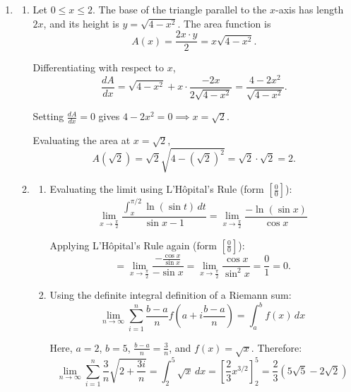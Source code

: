 \documentclass[a4paper, 12pt]{article}
\renewcommand{\headrulewidth}{0pt}
\renewcommand{\headrulewidth}{0pt}
\begin{document}
\newpage
{}
{}

\newpage
\pagestyle{fancy}
\renewcommand{\headrulewidth}{1pt}


\begin{enumerate}[leftmargin=*,label=\textbf{\arabic*.}]

\item \begin{enumerate}[leftmargin=*,label=\textbf{\alph*.}]
\item Let $0 \le x \le 2$. The base of the triangle parallel to the $x$-axis has length $2x$, and its height is $y = \sqrt{4-x^2}$. The area function is
\[A(x)=\frac{2x\cdot y}{2}=x\sqrt{4-x^2}.\]

Differentiating with respect to $x$,
\[\frac{dA}{dx}=\sqrt{4-x^2}+x\cdot\frac{-2x}{2\sqrt{4-x^2}}=\frac{4-2x^2}{\sqrt{4-x^2}}.\]

Setting $\frac{dA}{dx}=0$ gives $4-2x^2=0\implies x=\sqrt{2}$.

Evaluating the area at $x = \sqrt{2}$,
\[A\left(\sqrt{2}\right)=\sqrt{2}\sqrt{4-\left(\sqrt2\right)^2}=\sqrt2\cdot\sqrt{2}=\boxed2.\]

\item \begin{enumerate}[leftmargin=*,label=\textbf{\roman*.}]
\item Evaluating the limit using L'Hôpital's Rule (form $\left[\frac{0}{0}\right]$):
\[\lim_{x \to \frac{\pi}{2}} \frac{\int_{x}^{\pi/2} \ln(\sin t) \, dt}{\sin x - 1} = \lim_{x \to \frac{\pi}{2}} \frac{-\ln(\sin x)}{\cos x}\]

Applying L'Hôpital's Rule again (form $\left[\frac{0}{0}\right]$):
\[=\lim_{x\to\frac{\pi}{2}}\frac{-\frac{\cos x}{\sin x}}{-\sin x}=\lim_{x\to\frac{\pi}{2}} \frac{\cos x}{\sin^2 x}=\frac{0}{1}=\boxed0.\]

\item Using the definite integral definition of a Riemann sum:
\[\lim_{n \to \infty} \sum_{i=1}^{n} \frac{b-a}{n} f\left(a + i \frac{b-a}{n}\right) = \int_{a}^{b} f(x) \, dx\]

Here, $a=2$, $b=5$, $\frac{b-a}{n}=\frac{3}{n}$, and $f(x)=\sqrt{x}$. Therefore:
\[\lim_{n \to \infty}\sum_{i=1}^{n}\frac{3}{n}\sqrt{2+\frac{3i}{n}}=\int_{2}^{5}\sqrt{x}\,dx=\left[\frac{2}{3}x^{3/2}\right]_{2}^{5}=\boxed{\frac{2}{3}\left(5\sqrt5-2\sqrt2\right)}\]
\end{enumerate}
\end{enumerate}


\end{enumerate}
\end{document}
